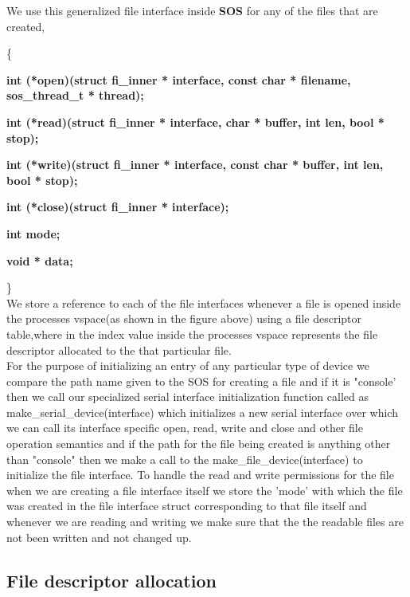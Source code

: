 We use this generalized file interface inside \textbf{SOS} for any of the files that are created,

\noindent
\{ \par
    \textbf{int (*open)(struct fi\_inner * interface, const char * filename, sos\_thread\_t * thread);} \par
    \textbf{int (*read)(struct fi\_inner * interface, char * buffer, int len, bool * stop);} \par
    \textbf{int (*write)(struct fi\_inner * interface, const char * buffer, int len, bool * stop);} \par
    \textbf{int (*close)(struct fi\_inner * interface);} \par
    \textbf{int mode;} \par
    \textbf{void * data;} \par
    \noindent
\} \\

\noindent
We store a reference to each of the file interfaces whenever a file is opened inside the processes vspace(as shown in the figure above) using a file descriptor table,where in
the index value inside the processes vspace represents the file descriptor allocated to the that particular file.
\\

\noindent
For the purpose of initializing an entry of any particular type of device we compare the path name given to the SOS for creating a file and if it is "console' then we call our specialized serial interface initialization function called as 
make\_serial\_device(interface) which initializes a new serial interface over which we can call its interface specific open, read, write and close and other file operation semantics and if 
the path for the file being created is anything other than "console" then we make a call to the make\_file\_device(interface) to initialize the file interface.
To handle the read and write permissions for the file when we are creating a file interface itself we store the 'mode' with which the file was created in
the file interface struct corresponding to that file itself and whenever we are reading and writing we make sure that the the readable files are not been written and not changed up.
\\

\subsection{File descriptor allocation}

